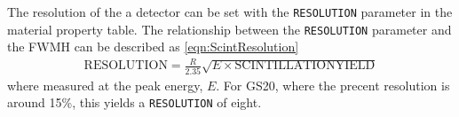 The resolution of the a detector can be set with the \verb+RESOLUTION+ parameter in the material property table.
The relationship between the \verb+RESOLUTION+ parameter and the FWMH can be described as \eqref{eqn:ScintResolution}
\begin{align}
	\label{eqn:ScintResolution}
	\text{RESOLUTION} = \frac{R}{2.35} \sqrt{E\times\text{SCINTILLATIONYIELD}}
\end{align}
where  measured at the peak energy, $E$.
For GS20, where the precent resolution is around 15\%, this yields a \verb+RESOLUTION+ of eight.

